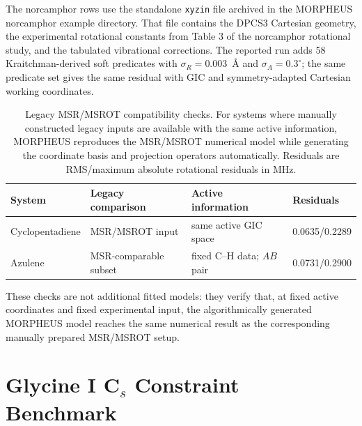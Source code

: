 \documentclass[12pt]{article}
\begin{document}
The norcamphor rows use the standalone \texttt{xyzin} file archived in the
MORPHEUS norcamphor example directory.  That file contains the DPCS3 Cartesian
geometry, the experimental rotational constants from Table 3 of the
norcamphor rotational study, and the tabulated vibrational corrections.  The
reported run adds 58 Kraitchman-derived soft predicates with
$\sigma_R=0.003$~\AA{} and $\sigma_A=0.3^\circ$; the same predicate set gives
the same residual with GIC and symmetry-adapted Cartesian working coordinates.

\begin{table}
\caption{Legacy MSR/MSROT compatibility checks. For systems where manually
constructed legacy inputs are available with the same active information,
MORPHEUS reproduces the MSR/MSROT numerical model while generating the
coordinate basis and projection operators automatically. Residuals are
RMS/maximum absolute rotational residuals in MHz.}
\label{tab:si-msrot-checks}
\footnotesize
\begin{tabular}{llll}
\toprule
System & Legacy comparison & Active information & Residuals \\
\midrule
Cyclopentadiene & MSR/MSROT input & same active GIC space & 0.0635/0.2289 \\
Azulene & MSR-comparable subset & fixed C--H data; $AB$ pair & 0.0731/0.2900 \\
\bottomrule
\end{tabular}
\end{table}

These checks are not additional fitted models: they verify that, at fixed
active coordinates and fixed experimental input, the algorithmically generated
MORPHEUS model reaches the same numerical result as the corresponding
manually prepared MSR/MSROT setup.

\section{\texorpdfstring{Glycine I C$_s$ Constraint Benchmark}{Glycine I Cs Constraint Benchmark}}
\end{document}
